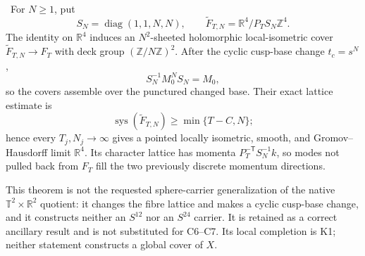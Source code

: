\begin{auditrecord}
\Verified\ For \(N\geq1\), put
\[
 S_N=\operatorname{diag}(1,1,N,N),\qquad
 \widetilde F_{T,N}=\mathbb R^4/P_TS_N\mathbb Z^4.
\]
The identity on \(\mathbb R^4\) induces an \(N^2\)-sheeted holomorphic
local-isometric cover \(\widetilde F_{T,N}\to F_T\) with deck group
\((\mathbb Z/N\mathbb Z)^2\).  After the cyclic cusp-base change
\(t_c=s^N\),
\[
 S_N^{-1}M_0^NS_N=M_0,
\]
so the covers assemble over the punctured changed base.  Their exact lattice
estimate is
\[
 \operatorname{sys}(\widetilde F_{T,N})\geq\min\{T-C,N\};
\]
hence every \(T_j,N_j\to\infty\) gives a pointed locally isometric, smooth,
and Gromov--Hausdorff limit \(\mathbb R^4\).  Its character lattice has
momenta \(P_T^{-\mathsf T}S_N^{-1}k\), so modes not pulled back from
\(F_T\) fill the two previously discrete momentum directions.

This theorem is not the requested sphere-carrier generalization of the
native \(\mathbb T^2\times\mathbb R^2\) quotient: it changes the fibre
lattice and makes a cyclic cusp-base change, and it constructs neither an
\(S^{12}\) nor an \(S^{24}\) carrier.  It is retained as a correct
ancillary result and is not substituted for C6--C7.  Its local completion is
K1; neither statement constructs a global cover of \(X\).
\end{auditrecord}

